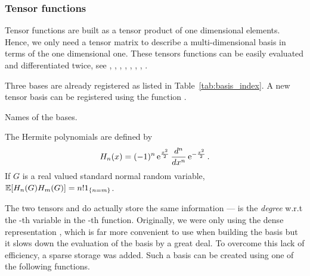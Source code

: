 \subsubsection{Tensor functions}

Tensor functions are built as a tensor product of one dimensional elements. Hence, we only need a tensor matrix  to describe a multi-dimensional basis in terms of the one dimensional one. These tensors functions can be easily evaluated and differentiated twice, see ,
, , ,
, ,
, .

Three bases are already registered as listed in Table~\ref{tab:basis_index}. A new tensor basis can be registered using the function
  .

\begin{table}[h!]
  \begin{describeconst}
  \end{describeconst}
  \caption{Names of the bases.}
  \label{tab:basis_index}
\end{table}

The Hermite polynomials are defined by
\begin{equation*}
  H_n(x) = (-1)^n \operatorname{e}^{ \frac{x^2}{2} } \frac{d^n}{dx^n} \operatorname{e}^{ -\frac{x^2}{2} }.
\end{equation*}
If $G$ is a real valued standard normal random variable, ${\mathbb E}[H_n(G) H_m(G)] = n!  1_{\left\{n = m\right\}}$.


The two tensors  and  do actually store the same information ---  is the \emph{degree} w.r.t the -th variable in the -th function. Originally, we were only using the dense representation , which is far more convenient to use when building the basis but it slows down the evaluation of the basis by a great deal. To overcome this lack of efficiency, a sparse storage was added. Such a basis can be created using one of the following functions.

